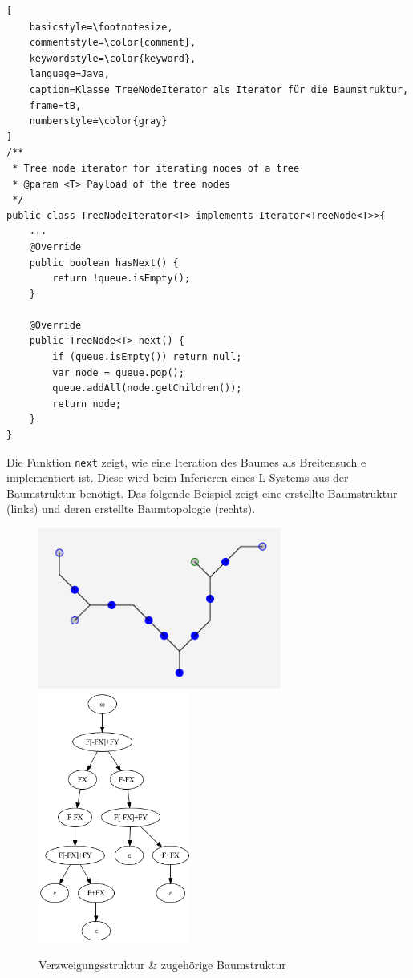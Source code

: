 \begin{lstlisting}[
    basicstyle=\footnotesize,
    commentstyle=\color{comment},
    keywordstyle=\color{keyword},
    language=Java,
    caption=Klasse TreeNodeIterator als Iterator für die Baumstruktur,
    frame=tB,
    numberstyle=\color{gray}
]
/**
 * Tree node iterator for iterating nodes of a tree
 * @param <T> Payload of the tree nodes
 */
public class TreeNodeIterator<T> implements Iterator<TreeNode<T>>{
    ...
    @Override
    public boolean hasNext() {
        return !queue.isEmpty();
    }

    @Override
    public TreeNode<T> next() {
        if (queue.isEmpty()) return null;
        var node = queue.pop();
        queue.addAll(node.getChildren());
        return node;
    }
}
\end{lstlisting}
Die Funktion \texttt{next} zeigt, wie eine Iteration des Baumes als Breitensuch e implementiert ist.
Diese wird beim Inferieren eines L-Systems aus der Baumstruktur benötigt.
Das folgende Beispiel zeigt eine erstellte Baumstruktur (links) und deren erstellte Baumtopologie (rechts).
\begin{figure}[H]
    \centering
    \includegraphics[width=8cm]{../images/graph_tree.png}
    \includegraphics[width=5cm]{../images/tree_graph.png}
    \caption{Verzweigungsstruktur \& zugehörige Baumstruktur}
\end{figure}

